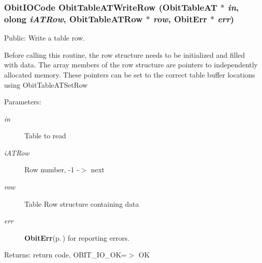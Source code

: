 \subsubsection{\setlength{\rightskip}{0pt plus 5cm}Obit\-IOCode Obit\-Table\-ATWrite\-Row ({\bf Obit\-Table\-AT} $\ast$ {\em in}, {\bf olong} {\em i\-ATRow}, {\bf Obit\-Table\-ATRow} $\ast$ {\em row}, {\bf Obit\-Err} $\ast$ {\em err})}\label{ObitTableAT_8c_a24}


Public: Write a table row. 

Before calling this routine, the row structure needs to be initialized and filled with data. The array members of the row structure are pointers to independently allocated memory. These pointers can be set to the correct table buffer locations using Obit\-Table\-ATSet\-Row \begin{Desc}
\item[Parameters:]
\begin{description}
\item[{\em in}]Table to read \item[{\em i\-ATRow}]Row number, -1 -$>$ next \item[{\em row}]Table Row structure containing data \item[{\em err}]{\bf Obit\-Err}{\rm (p.\,\pageref{structObitErr})} for reporting errors. \end{description}
\end{Desc}
\begin{Desc}
\item[Returns:]return code, OBIT\_\-IO\_\-OK=$>$ OK \end{Desc}
